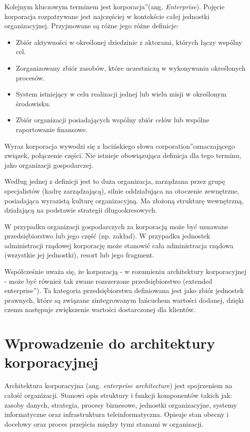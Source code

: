 Kolejnym kluczowym terminem jest \quotedblbase korporacja\textquotedblright (ang. \textit{Enterprise}). Pojęcie korporacja rozpatrywane jest najczęściej w kontekście całej jednostki organizacyjnej. Przyjmowane są różne jego różne definicje:
\begin{itemize}
\item{Zbiór aktywności w określonej dziedzinie z aktorami, których łączy wspólny cel.}
\item{Zorganizowany zbiór zasobów, które uczestniczą w wykonywaniu określonych procesów.}
\item{System istniejący w celu realizacji jednej lub wielu misji w określonym środowisku.}
\item{Zbiór organizacji posiadających wspólny zbiór celów lub wspólne raportowanie finansowe.}
\end{itemize}

Wyraz korporacja wywodzi się z łacińskiego słowa \quotedblbase corporation\textquotedblright oznaczającego związek, połączenie części. Nie istnieje obowiązująca definicja dla tego terminu, jako organizacji gospodarczej. 

Według jednej z definicji jest to duża organizacja, zarządzana przez grupę specjalistów (kadrę zarządzającą), silnie oddziałująca na otoczenie zewnętrzne, posiadająca wyrazistą kulturę organizacyjną. Ma złożoną strukturę wewnętrzną, działającą na podstawie strategii długookresowych.

W przypadku organizacji gospodarczych za korporacją może być uznawane przedsiębiorstwo lub jego część (np. zakład). W przypadku jednostek administracji rządowej korporację może stanowić cała administracja rządowa (wszystkie jej jednostki), resort lub jego fragment.

Współcześnie uważa się, że korporacją - w rozumieniu architektury korporacyjnej - może być również tak zwane rozszerzone przedsiębiorstwo (\quotedblbase extended enterprise\textquotedblright). Ta kategoria przedsiębiorstwa definiowana jest jako zbiór jednostek prawnych, które są związane zintegrowanym łańcuchem wartości dodanej, dzięki czemu następuje zwiększenie wartości dostarczonej dla klientów.\cite{SobArchKorpDobrPr} 

\section{Wprowadzenie do architektury korporacyjnej}
Architektura korporacyjna (ang. \emph{enterprise architecture}) jest spojrzeniem na całość organizacji. Stanowi opis struktury i funkcji komponentów takich jak: zasoby danych, strategia, procesy biznesowe, jednostki organizacyjne, systemy informatyczne oraz infrastruktura teleinformatyczna. Opisuje stan obecny i docelowy oraz proces przejścia między tymi stanami w organizacji.\cite{ArchKorpSob}

